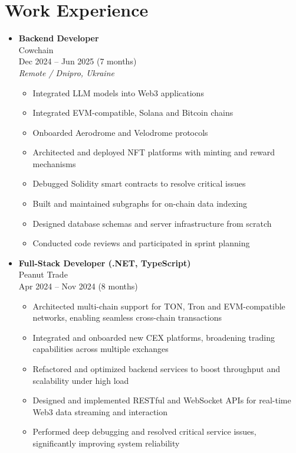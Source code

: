 \section{Work Experience}\label{sec:work-experience}
\begin{itemize}[noitemsep]
    \item \textbf{Backend Developer} \\
    Cowchain \\
    Dec 2024 -- Jun 2025 \;(7 months) \\
    \textit{Remote / Dnipro, Ukraine}
    \begin{itemize}[noitemsep]
        \item Integrated LLM models into Web3 applications
        \item Integrated EVM-compatible, Solana and Bitcoin chains
        \item Onboarded Aerodrome and Velodrome protocols
        \item Architected and deployed NFT platforms with minting and reward mechanisms
        \item Debugged Solidity smart contracts to resolve critical issues
        \item Built and maintained subgraphs for on-chain data indexing
        \item Designed database schemas and server infrastructure from scratch
        \item Conducted code reviews and participated in sprint planning
    \end{itemize}

    \item \textbf{Full-Stack Developer (.NET, TypeScript)} \\
    Peanut Trade \\
    Apr 2024 -- Nov 2024 \;(8 months)
    \begin{itemize}[noitemsep]
        \item Architected multi-chain support for TON, Tron and EVM-compatible networks, enabling seamless cross-chain transactions
        \item Integrated and onboarded new CEX platforms, broadening trading capabilities across multiple exchanges
        \item Refactored and optimized backend services to boost throughput and scalability under high load
        \item Designed and implemented RESTful and WebSocket APIs for real-time Web3 data streaming and interaction
        \item Performed deep debugging and resolved critical service issues, significantly improving system reliability
    \end{itemize}


\end{itemize}
